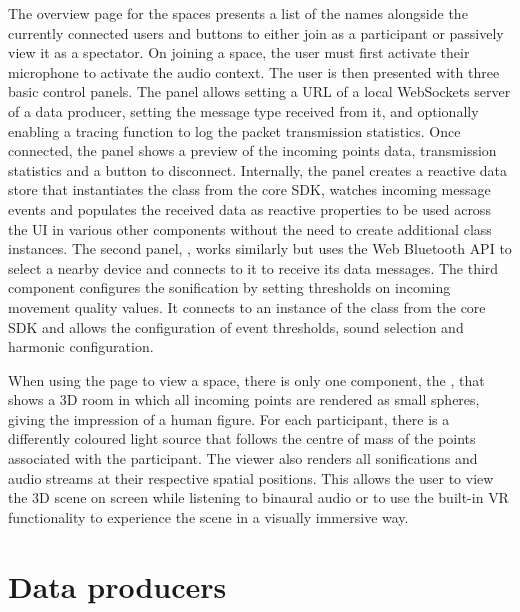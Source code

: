 The overview page for the spaces presents a list of the names alongside the currently connected users and buttons to either join as a participant or passively view it as a spectator.
On joining a space, the user must first activate their microphone to activate the audio context.
The user is then presented with three basic control panels.
The  panel allows setting a URL of a local WebSockets server of a data producer, setting the message type received from it, and optionally enabling a tracing function to log the packet transmission statistics.
Once connected, the panel shows a preview of the incoming points data, transmission statistics and a button to disconnect.
Internally, the panel creates a reactive data store that instantiates the  class from the core \ac{SDK}, watches incoming message events and populates the received data as reactive properties to be used across the \ac{UI} in various other components without the need to create additional class instances.
The second panel, , works similarly but uses the Web Bluetooth \ac{API} to select a nearby device and connects to it to receive its data messages.
The third component configures the sonification by setting thresholds on incoming movement quality values.
It connects to an instance of the  class from the core \ac{SDK} and allows the configuration of event thresholds, sound selection and harmonic configuration.

When using the page to view a space, there is only one component, the , that shows a \ac{3D} room in which all incoming points are rendered as small spheres, giving the impression of a human figure.
For each participant, there is a differently coloured light source that follows the centre of mass of the points associated with the participant.
The viewer also renders all sonifications and audio streams at their respective spatial positions.
This allows the user to view the \ac{3D} scene on screen while listening to binaural audio or to use the built-in \ac{VR} functionality to experience the scene in a visually immersive way.

\section{Data producers}
\label{sec:data-producers}

